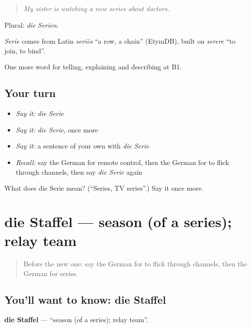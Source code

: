 \begin{quote}
\emph{My sister is watching a new series about doctors.}
\end{quote}

Plural: \emph{die Serien}.

\begin{cousinweb}
\emph{Serie} comes from Latin \emph{seriēs} \textquotedblleft{}a row, a chain\textquotedblright{} (EtymDB), built on \emph{serere} \textquotedblleft{}to join, to bind\textquotedblright{}.
\end{cousinweb}

\begin{grammarlens}[title={What you've built}]
One more word for telling, explaining and describing at B1.
\end{grammarlens}

\subsection*{Your turn}
\begin{itemize}
\raggedright
  \item \emph{Say it:} \emph{die Serie}
  \item \emph{Say it:} \emph{die Serie}, once more
  \item \emph{Say it:} a sentence of your own with \emph{die Serie}
  \item \emph{Recall:} say the German for remote control, then the German for to flick through channels, then say \emph{die Serie} again
\end{itemize}

\begin{tcolorbox}[breakable,colback=teal!4,colframe=teal!35!black,title={Before you move on}]
What does die Serie mean? (\textquotedblleft{}Series, TV series\textquotedblright{}.) Say it once more.
\end{tcolorbox}
\section[die Staffel]{die Staffel — season (of a series); relay team}

\label{lesson:GE-C523-staffel}



\begin{quote}
Before the new one: say the German for to flick through channels, then the German for series.
\end{quote}

\subsection*{You'll want to know: die Staffel}
\textbf{die Staffel} — \textquotedblleft{}season (of a series); relay team\textquotedblright{}.

